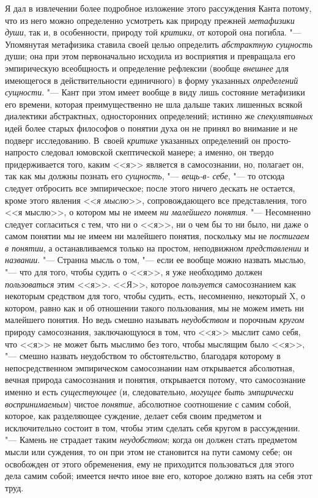 Я дал в извлечении более подробное изложение этого рассуждения
Канта потому, что из него можно определенно усмотреть как природу прежней
{\em метафизики души},
так и, в особенности, природу той
{\em критики}, от которой
она погибла. "--- Упомянутая метафизика ставила своей целью
определить {\em абстрактную сущность}
души; она при этом первоначально исходила из восприятия и
превращала его эмпирическую всеобщность и определение рефлексии (вообще
{\em внешнее} для
имеющегося в действительности единичного) в форму указанных
{\em определений сущности}. "---
Кант при этом имеет вообще в виду лишь состояние метафизики
его времени, которая преимущественно не шла дальше таких лишенных всякой
диалектики абстрактных, односторонних определений; истинно же
{\em спекулятивных} идей
более старых философов о понятии духа он не принял во внимание и не подверг
исследованию. В~своей {\em критике}
указанных определений он просто-напросто следовал юмовской
скептической манере; а именно, он твердо придерживается того, каким <<я>>
является в самосознании, но, полагает он, так как мы должны познать его
{\em сущность}, "---
{\em вещь-в- себе}, "--- то
отсюда следует отбросить все эмпирическое; после этого ничего дескать не
остается, кроме этого явления
<<{\em я мыслю}>>,
сопровождающего все представления, того <<я мыслю>>, о котором
мы не имеем {\em ни малейшего понятия}.
"--- Несомненно следует согласиться с тем, что ни о <<я>>, ни о
чем бы то ни было, ни даже о самом понятии мы не имеем ни малейшего
понятия, поскольку мы не {\em постигаем
в понятии}, а останавливаемся только на простом, неподвижном
{\em представлении} и
{\em названии}. "--- Странна
мысль о том, "--- если ее вообще можно назвать мыслью, "---
что для того, чтобы судить о <<я>>, я уже необходимо должен
{\em пользоваться} этим
<<я>>. <<Я>>, которое {\em пользуется}
самосознанием как некоторым средством для того, чтобы судить,
есть, несомненно, некоторый X, о котором, равно как и об отношении такого
пользования, мы не можем иметь ни малейшего понятия. Но ведь смешно
называть {\em неудобством}
и порочным
{\em кругом}
природу самосознания, заключающуюся в том, что <<я>> мыслит
само себя, что <<я>> не может быть мыслимо без того, чтобы мыслящим было
<<я>>, "--- смешно назвать неудобством то обстоятельство,
благодаря которому в непосредственном эмпирическом
самосознании нам открывается абсолютная, вечная природа самосознания и
понятия, открывается потому, что самосознание именно и есть
{\em существующее} (и,
следовательно, {\em могущее быть
эмпирически воспринимаемым}) чистое
{\em понятие}, абсолютное
соотношение с самим собой, которое, как разделяющее суждение, делает себя
своим предметом и исключительно состоит в том, чтобы этим сделать себя
кругом в рассуждении. "--- Камень не страдает таким
{\em неудобством}; когда
он должен стать предметом мысли или суждения, то он при этом не становится
на пути самому себе; он освобожден от этого обременения, ему не приходится
пользоваться для этого дела самим собой; имеется нечто иное вне его,
которое должно взять на себя этот труд.

